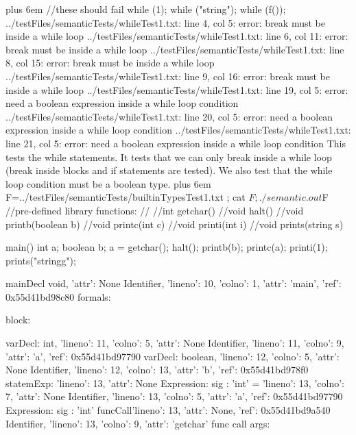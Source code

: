 \documentclass{article}
\makeatletter
\newenvironment{myverb}
 {\def\@xobeysp{\ }\verbatim\rightskip=0pt plus 6em\relax}
 {\endverbatim}
\makeatother
\begin{document}
\begin{itemize}
\begin{myverb}
{    //these should fail
    while (1);
    while ("string");
    while (f());
}
../testFiles/semanticTests/whileTest1.txt: line 4, col 5: error: break must be inside a while loop
../testFiles/semanticTests/whileTest1.txt: line 6, col 11: error: break must be inside a while loop
../testFiles/semanticTests/whileTest1.txt: line 8, col 15: error: break must be inside a while loop
../testFiles/semanticTests/whileTest1.txt: line 9, col 16: error: break must be inside a while loop
../testFiles/semanticTests/whileTest1.txt: line 19, col 5: error: need a boolean expression inside a while loop condition
../testFiles/semanticTests/whileTest1.txt: line 20, col 5: error: need a boolean expression inside a while loop condition
../testFiles/semanticTests/whileTest1.txt: line 21, col 5: error: need a boolean expression inside a while loop condition
\end{myverb}
This tests the while statements. It tests that we can only break inside a while loop (break inside blocks and if statements are tested). We also test that the while loop condition must be a boolean type.
\begin{myverb}
F=../testFiles/semanticTests/builtinTypesTest1.txt ; cat $F; ./semantic.out $F
//pre-defined library functions:
//
//int getchar()
//void halt()	
//void printb(boolean b)	
//void printc(int c)	
//void printi(int i)	
//void prints(string s)

main(){
    int a;
    boolean b;
    a = getchar();
    halt();
    printb(b);
    printc(a);
    printi(1);
    prints("stringg");
}

mainDecl
    void, {'attr': None}
    Identifier, {'lineno': 10, 'colno': 1, 'attr': 'main', 'ref': 0x55d41bd98c80}
      formals:

    block:

      varDecl:
        int, {'lineno': 11, 'colno': 5, 'attr': None}
        Identifier, {'lineno': 11, 'colno': 9, 'attr': 'a', 'ref': 0x55d41bd97790}
      varDecl:
        boolean, {'lineno': 12, 'colno': 5, 'attr': None}
        Identifier, {'lineno': 12, 'colno': 13, 'attr': 'b', 'ref': 0x55d41bd978f0}
      statemExp: {'lineno': 13, 'attr': None}
        Expression: {sig : 'int'}
          = {'lineno': 13, 'colno': 7, 'attr': None}
            Identifier, {'lineno': 13, 'colno': 5, 'attr': 'a', 'ref': 0x55d41bd97790}
            Expression: {sig : 'int'}
              funcCall{'lineno': 13, 'attr': None, 'ref': 0x55d41bd9a540}
                Identifier, {'lineno': 13, 'colno': 9, 'attr': 'getchar'}
                func call args:




\end{myverb}
\end{itemize}
\end{document}
